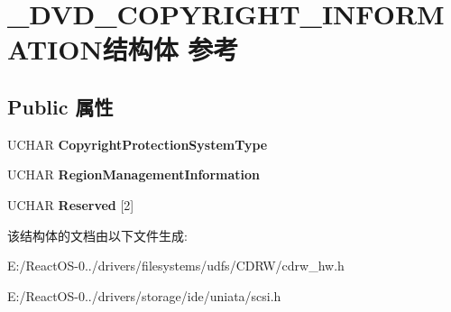 \hypertarget{struct___d_v_d___c_o_p_y_r_i_g_h_t___i_n_f_o_r_m_a_t_i_o_n}{}\section{\+\_\+\+D\+V\+D\+\_\+\+C\+O\+P\+Y\+R\+I\+G\+H\+T\+\_\+\+I\+N\+F\+O\+R\+M\+A\+T\+I\+O\+N结构体 参考}
\label{struct___d_v_d___c_o_p_y_r_i_g_h_t___i_n_f_o_r_m_a_t_i_o_n}
\subsection*{Public 属性}
\begin{DoxyCompactItemize}
\item 
\mbox{\label{struct___d_v_d___c_o_p_y_r_i_g_h_t___i_n_f_o_r_m_a_t_i_o_n_acd8207c2623db61fc4de8240564521e7}} 
U\+C\+H\+AR {\bfseries Copyright\+Protection\+System\+Type}
\item 
\mbox{\label{struct___d_v_d___c_o_p_y_r_i_g_h_t___i_n_f_o_r_m_a_t_i_o_n_a21a26d788424658215b45b9d116f1fef}} 
U\+C\+H\+AR {\bfseries Region\+Management\+Information}
\item 
\mbox{\label{struct___d_v_d___c_o_p_y_r_i_g_h_t___i_n_f_o_r_m_a_t_i_o_n_a877f517cd2469262f9ba427baeb3929d}} 
U\+C\+H\+AR {\bfseries Reserved} \mbox{[}2\mbox{]}
\end{DoxyCompactItemize}


该结构体的文档由以下文件生成\+:\begin{DoxyCompactItemize}
\item 
E\+:/\+React\+O\+S-\/0../drivers/filesystems/udfs/\+C\+D\+R\+W/cdrw\+\_\+hw.\+h\item 
E\+:/\+React\+O\+S-\/0../drivers/storage/ide/uniata/scsi.\+h\end{DoxyCompactItemize}
